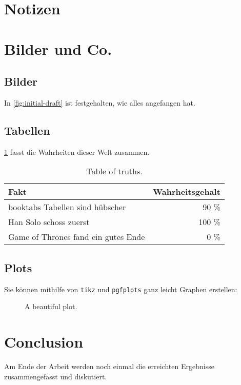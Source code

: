 \section{Notizen}%



\section{Bilder und Co.}

\subsection{Bilder}%
\label{sec:figures}

In \cref{fig:initial-draft} ist festgehalten,
wie alles angefangen hat.


\subsection{Tabellen}%
\label{sec:tables}

\cref{table:truths} fasst die Wahrheiten dieser Welt zusammen.

\begin{table}[ht]
  \begin{center}
    \begin{tabular}{lr}
      \toprule
      Fakt                                & Wahrheitsgehalt \\
      \midrule
      booktabs Tabellen sind hübscher     & 90 \%           \\
      Han Solo schoss zuerst              & 100 \%          \\
      Game of Thrones fand ein gutes Ende & 0 \%            \\
      \bottomrule
    \end{tabular}
    \caption{Table of truths.}%
    \label{table:truths}
  \end{center}
\end{table}

\subsection{Plots}%
\label{sec:plot}

Sie können mithilfe von \texttt{tikz} und \texttt{pgfplots}
ganz leicht Graphen erstellen:

\begin{figure}[ht]
  \centering
  \caption{A beautiful plot.}%
  \label{fig:the-plot}
\end{figure}

\section{Conclusion}

Am Ende der Arbeit werden noch einmal die erreichten Ergebnisse
zusammengefasst und diskutiert.
